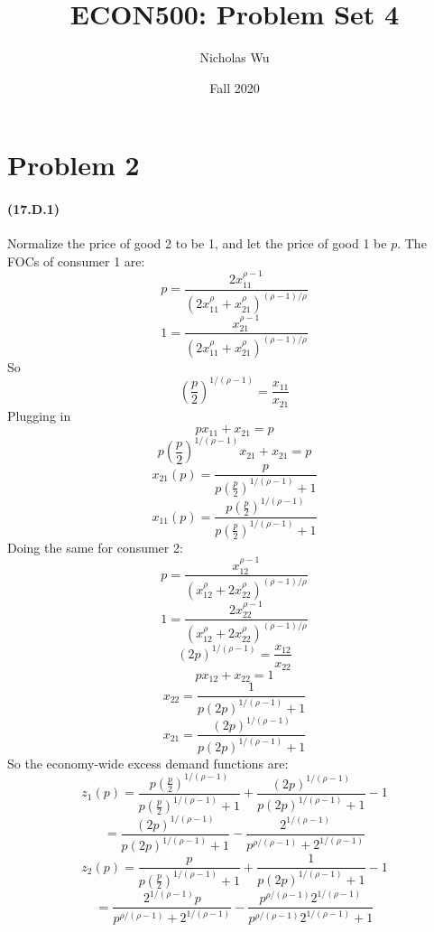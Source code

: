 \documentclass[10pt,letter]{article}
\begin{document}


\title{ECON500: Problem Set 4}

\author{Nicholas Wu}

\date{Fall 2020}

\maketitle


\section*{Problem 2}
\paragraph{(17.D.1)}
Normalize the price of good 2 to be 1, and let the price of good 1 be $p$. The FOCs of consumer 1 are:
\[ p = \frac{2x_{11}^{\rho-1}}{(2x_{11}^\rho + x_{21}^\rho)^{(\rho-1)/\rho}} \]
\[ 1 = \frac{x_{21}^{\rho-1}}{(2x_{11}^\rho + x_{21}^\rho)^{(\rho-1)/\rho}} \]
So
\[ \left(\frac{p}{2} \right)^{1/(\rho-1)}= \frac{x_{11}}{x_{21}} \]
Plugging in
\[ px_{11} + x_{21} = p \]
\[ p\left(\frac{p}{2} \right)^{1/(\rho-1)}x_{21} + x_{21} = p \]
\[ x_{21}(p) = \frac{p}{p\left(\frac{p}{2} \right)^{1/(\rho-1)} + 1} \]
\[ x_{11}(p) = \frac{p\left(\frac{p}{2} \right)^{1/(\rho-1)}}{p\left(\frac{p}{2} \right)^{1/(\rho-1)} + 1} \]
Doing the same for consumer 2:
\[ p = \frac{x_{12}^{\rho-1}}{(x_{12}^\rho + 2x_{22}^\rho)^{(\rho-1)/\rho}} \]
\[ 1 = \frac{2x_{22}^{\rho-1}}{(x_{12}^\rho + 2x_{22}^\rho)^{(\rho-1)/\rho}} \]
\[ (2p)^{1/(\rho-1)} = \frac{x_{12}}{x_{22}}  \]
\[ px_{12} + x_{22} = 1 \]
\[x_{22} = \frac{1}{ p(2p)^{1/(\rho-1)} + 1} \]
\[x_{21} = \frac{(2p)^{1/(\rho-1)}}{ p(2p)^{1/(\rho-1)} + 1} \]
So the economy-wide excess demand functions are:
\[ z_1(p) = \frac{p\left(\frac{p}{2} \right)^{1/(\rho-1)}}{p\left(\frac{p}{2} \right)^{1/(\rho-1)} + 1} + \frac{(2p)^{1/(\rho-1)}}{ p(2p)^{1/(\rho-1)} + 1} - 1\]
\[ = \frac{(2p)^{1/(\rho-1)}}{ p(2p)^{1/(\rho-1)} + 1} - \frac{2^{1/(\rho-1)}}{p^{\rho/(\rho-1)} + 2^{1/(\rho-1)}} \]
\[ z_2(p) = \frac{p}{p\left(\frac{p}{2} \right)^{1/(\rho-1)} + 1} + \frac{1}{ p(2p)^{1/(\rho-1)} + 1} - 1\]
\[= \frac{2^{1/(\rho-1)} p}{p^{\rho/(\rho-1)} + 2^{1/(\rho-1)} } - \frac{p^{\rho/(\rho-1)}2^{1/(\rho-1)}}{ p^{\rho/(\rho-1)}2^{1/(\rho-1)} + 1}\]
\end{document}
